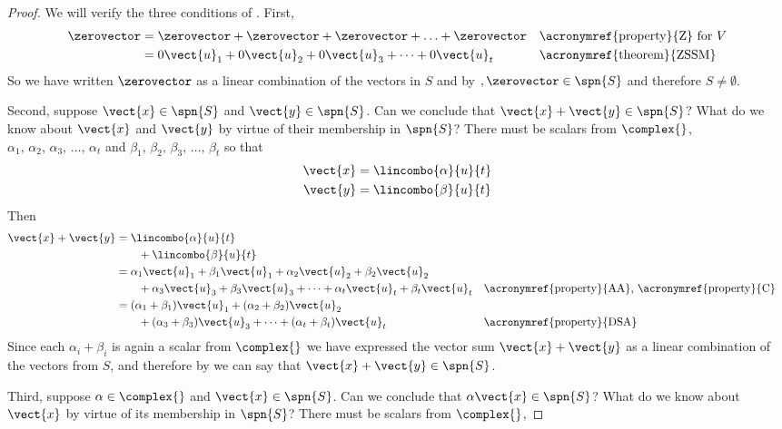 \begin{proof}
We will verify the three conditions of .  First,
%
\begin{align*}
\zerovector
&=\zerovector+\zerovector+\zerovector+\ldots+\zerovector&&\text{\acronymref{property}{Z} for $V$}\\
&=0\vect{u}_1+0\vect{u}_2+0\vect{u}_3+\cdots+0\vect{u}_t&&\text{\acronymref{theorem}{ZSSM}}
\end{align*}
%
So we have written $\zerovector$ as a linear combination of the vectors in $S$ and by $, \zerovector\in\spn{S}$ and therefore $S\neq\emptyset$.\par
%
Second, suppose $\vect{x}\in\spn{S}$ and $\vect{y}\in\spn{S}$.  Can we conclude that $\vect{x}+\vect{y}\in\spn{S}$?  What do we know about $\vect{x}$ and $\vect{y}$ by virtue of their membership in $\spn{S}$?  There must be scalars from $\complex{\null}$,
$\alpha_1,\,\alpha_2,\,\alpha_3,\,\ldots,\,\alpha_t$ and
$\beta_1,\,\beta_2,\,\beta_3,\,\ldots,\,\beta_t$ so that
%
\begin{align*}
\vect{x}&=\lincombo{\alpha}{u}{t}\\
\vect{y}&=\lincombo{\beta}{u}{t}
\end{align*}
%
Then
%
\begin{align*}
\vect{x}+\vect{y}&=\lincombo{\alpha}{u}{t}\\
&\quad\quad+\lincombo{\beta}{u}{t}\\
&=\alpha_1\vect{u}_1+\beta_1\vect{u}_1+\alpha_2\vect{u}_2+\beta_2\vect{u}_2\\
&\quad\quad+\alpha_3\vect{u}_3+\beta_3\vect{u}_3+\cdots+\alpha_t\vect{u}_t+\beta_t\vect{u}_t&&\text{\acronymref{property}{AA}, \acronymref{property}{C}}\\
&=(\alpha_1+\beta_1)\vect{u}_1+(\alpha_2+\beta_2)\vect{u}_2\\
&\quad\quad+(\alpha_3+\beta_3)\vect{u}_3+\cdots+(\alpha_t+\beta_t)\vect{u}_t&&\text{\acronymref{property}{DSA}}
\end{align*}
%
Since each $\alpha_i+\beta_i$ is again a scalar from $\complex{\null}$ we have expressed the vector sum $\vect{x}+\vect{y}$ as a linear combination of the vectors from $S$, and therefore by  we can say that $\vect{x}+\vect{y}\in\spn{S}$.\par
%
Third, suppose $\alpha\in\complex{\null}$ and $\vect{x}\in\spn{S}$.  Can we conclude that $\alpha\vect{x}\in\spn{S}$?  What do we know about $\vect{x}$  by virtue of its membership in $\spn{S}$?  There must be scalars from $\complex{\null}$,

\end{proof}
